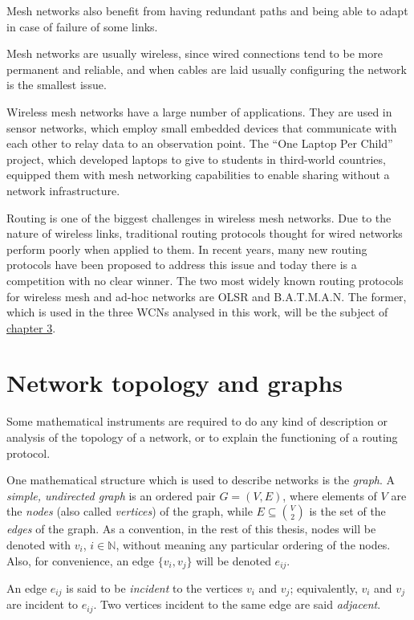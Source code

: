 \documentclass[a4paper,11pt,twoside,openleft]{memoir}
\begin{document}
Mesh networks also benefit from having redundant paths and being able to
adapt in case of failure of some links.

Mesh networks are usually wireless, since wired connections tend to be
more permanent and reliable, and when cables are laid usually configuring
the network is the smallest issue.

Wireless mesh networks have a large number of applications.
They are used in sensor networks, which employ small embedded devices that
communicate with each other to relay data to an observation point.
The ``One Laptop Per Child'' project, which developed laptops to give to
students in third-world countries, equipped them with mesh networking
capabilities to enable sharing without a network infrastructure.

Routing is one of the biggest challenges in wireless mesh networks. Due
to the nature of wireless links, traditional routing protocols
thought for wired networks perform poorly when applied to them. In
recent years, many new routing protocols have been proposed to address
this issue and today there is a competition with no clear winner. The
two most widely known routing protocols for wireless mesh and ad-hoc
networks are OLSR and B.A.T.M.A.N. The former, which is used in the three
WCNs analysed in this work, will be the subject of
\hyperref[olsr-survey]{chapter 3}.

\chapter{Network topology and graphs}\label{network-topology-and-graphs}

Some mathematical instruments are required to do any kind of description
or analysis of the topology of a network, or to explain the functioning
of a routing protocol.

One mathematical structure which is used to describe networks is the
\emph{graph}. A \emph{simple, undirected graph} is an ordered pair
$G = (V, E)$, where elements of $V$ are the \emph{nodes} (also called
\emph{vertices}) of the graph, while $E \subseteq \binom{V}{2}$ is the set of the
\emph{edges} of the graph. As a convention, in the rest of this thesis,
nodes will be denoted with $v_i$, $i \in \mathbb{N}$, without meaning any
particular ordering of the nodes. Also, for convenience, an edge
$\{v_i, v_j \}$ will be denoted $e_{ij}$.

An edge $e_{ij}$ is said to be \emph{incident} to the vertices $v_i$ and
$v_j$; equivalently, $v_i$ and $v_j$ are incident to $e_{ij}$. Two
vertices incident to the same edge are said \emph{adjacent}.
\end{document}

